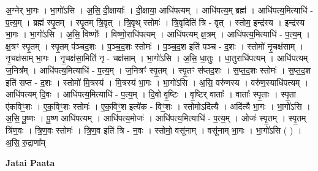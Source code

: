 \documentclass[17pt]{extarticle}
\begin{document}
अ॒ग्नेर् भा॒गः । भा॒गो॑ऽसि । अ॒सि॒ दी॒क्षायाः᳚ । दी॒क्षाया॒ आधि॑पत्यम् । आधि॑पत्य॒म् ब्रह्म॑ । आधि॑पत्य॒मित्याधि॑ - प॒त्य॒म् । ब्रह्म॑ स्पृ॒तम् । स्पृ॒तम् त्रि॒वृत् । त्रि॒वृथ् स्तोमः॑ । त्रि॒वृदिति॑ त्रि - वृत् । स्तोम॒ इन्द्र॑स्य । इन्द्र॑स्य भा॒गः । भा॒गो॑ऽसि । अ॒सि॒ विष्णोः᳚ । विष्णो॒राधि॑पत्यम् । आधि॑पत्यम् क्ष॒त्रम् । आधि॑पत्य॒मित्याधि॑ - प॒त्य॒म् । क्ष॒त्रꣳ स्पृ॒तम् । स्पृ॒तम् प॑ञ्चद॒शः । प॒ञ्च॒द॒शः स्तोमः॑ । प॒ञ्च॒द॒श इति॑ पञ्च - द॒शः । स्तोमो॑ नृ॒चक्ष॑साम् । नृ॒चक्ष॑साम् भा॒गः । नृ॒चक्ष॑सा॒मिति॑ नृ - चक्ष॑साम् । भा॒गो॑ऽसि । अ॒सि॒ धा॒तुः । धा॒तुराधि॑पत्यम् । आधि॑पत्यम् ज॒नित्र᳚म् । आधि॑पत्य॒मित्याधि॑ - प॒त्य॒म् । ज॒नित्रꣳ॑ स्पृ॒तम् । स्पृ॒तꣳ स॑प्तद॒शः । स॒प्त॒द॒शः स्तोमः॑ । स॒प्त॒द॒श इति॑ सप्त - द॒शः । स्तोमो॑ मि॒त्रस्य॑ । मि॒त्रस्य॑ भा॒गः । भा॒गो॑ऽसि । अ॒सि॒ वरु॑णस्य । वरु॑ण॒स्याधि॑पत्यम् । आधि॑पत्यम् दि॒वः । आधि॑पत्य॒मित्याधि॑ - प॒त्य॒म् । दि॒वो वृ॒ष्टिः । वृ॒ष्टिर् वाताः᳚ । वाताः᳚ स्पृ॒ताः । स्पृ॒ता ए॑कविꣳ॒॒शः । ए॒क॒विꣳ॒॒शः स्तोमः॑ । ए॒क॒विꣳ॒॒श इत्ये॑क - विꣳ॒॒शः । स्तोमोऽदि॑त्यै । अदि॑त्यै भा॒गः । भा॒गो॑ऽसि । अ॒सि॒ पू॒ष्णः । पू॒ष्ण आधि॑पत्यम् । आधि॑पत्य॒मोजः॑ । आधि॑पत्य॒मित्याधि॑ - प॒त्य॒म् । ओजः॑ स्पृ॒तम् । स्पृ॒तम् त्रि॑ण॒वः । त्रि॒ण॒वः स्तोमः॑ । त्रि॒ण॒व इति॑ त्रि - न॒वः । स्तोमो॒ वसू॑नाम् । वसू॑नाम् भा॒गः । भा॒गो॑ऽसि ( ) । अ॒सि॒ रु॒द्राणा᳚म् \newline

\textbf{Jatai Paata} \newline
\end{document}
